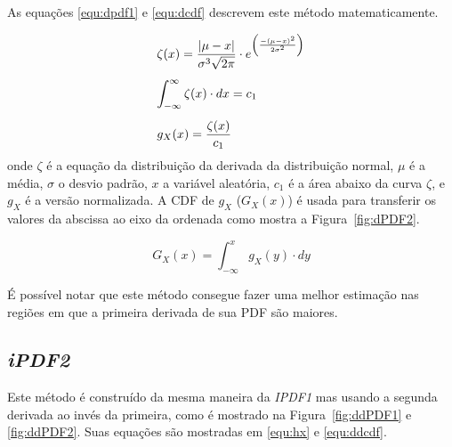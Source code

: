 As equações \eqref{equ:dpdf1} e \eqref{equ:dcdf} descrevem este método matematicamente.

\begin{equation}
\begin{array}{l}
\vspace{0.3cm}\displaystyle \zeta(x) = \frac{|\mu-x|}{\sigma^3\sqrt{2\pi}}\cdot e^{\left(\frac{-(\mu-x)^2}{2\sigma^2}\right) } \\
\vspace{0.3cm} \displaystyle \int_{-\infty}^{\infty} \zeta(x)\cdot dx = c_1 \\
\displaystyle g_X(x) = \frac{\zeta(x)}{c_1}
\label{equ:dpdf1}
\end{array}
\end{equation}
onde $\zeta$ é a equação da distribuição da derivada da distribuição normal, $\mu$ é a média, $\sigma$ o desvio padrão, $x$ a variável aleatória, $c_1$ é a área abaixo da curva $\zeta$, e $g_X$ é a versão normalizada.	
A \ac{CDF} de $g_X$ ($G_X(x)$) é usada para transferir os valores da abscissa ao eixo da ordenada como mostra a  Figura~\ref{fig:dPDF2}.

\begin{equation}
G_X(x) = \int_{-\infty}^x g_X(y)\cdot dy
\label{equ:dcdf}
\end{equation}

É possível notar que este método consegue fazer uma melhor estimação nas regiões em que a primeira derivada de sua \ac{PDF} são maiores.

\subsection{\textit{iPDF2}}
Este método é construído da mesma maneira da \textit{IPDF1} mas usando a segunda derivada ao invés da primeira, como é mostrado na Figura~\ref{fig:ddPDF1} e \ref{fig:ddPDF2}. Suas equações são mostradas em \eqref{equ:hx} e \eqref{equ:ddcdf}.

